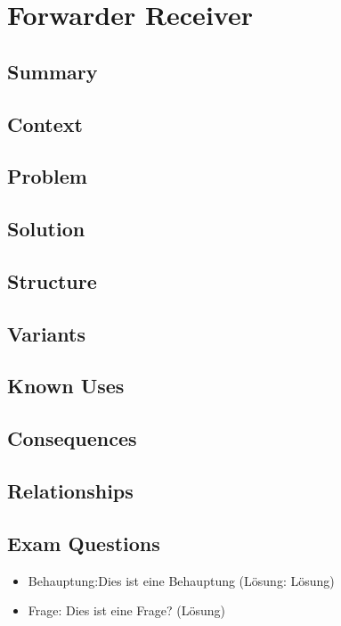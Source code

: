 \chapter{Forwarder Receiver}
\section{Summary}


\section{Context}


\section{Problem}


\section{Solution}


\section{Structure}


\section{Variants}


\section{Known Uses}


\section{Consequences}


\section{Relationships}


\section{Exam Questions}
\begin{itemize}
  	\item Behauptung:Dies ist eine Behauptung (Lösung: Lösung)
    \item Frage: Dies ist eine Frage? (Lösung)
\end{itemize}
